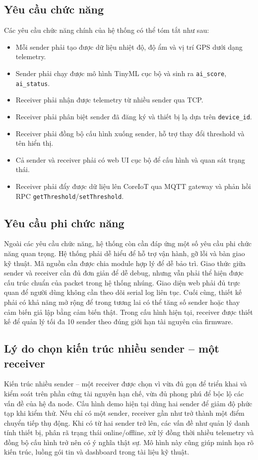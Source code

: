 \documentclass[12pt,a4paper]{report}
\begin{document}
\subsection{Yêu cầu chức năng}
Các yêu cầu chức năng chính của hệ thống có thể tóm tắt như sau:
\begin{itemize}[leftmargin=1.5em]
    \item Mỗi sender phải tạo được dữ liệu nhiệt độ, độ ẩm và vị trí GPS dưới dạng telemetry.
    \item Sender phải chạy được mô hình TinyML cục bộ và sinh ra \texttt{ai\_score}, \texttt{ai\_status}.
    \item Receiver phải nhận được telemetry từ nhiều sender qua TCP.
    \item Receiver phải phân biệt sender đã đăng ký và thiết bị lạ dựa trên \texttt{device\_id}.
    \item Receiver phải đồng bộ cấu hình xuống sender, hỗ trợ thay đổi threshold và tên hiển thị.
    \item Cả sender và receiver phải có web UI cục bộ để cấu hình và quan sát trạng thái.
    \item Receiver phải đẩy được dữ liệu lên CoreIoT qua MQTT gateway và phản hồi RPC \texttt{getThreshold}/\texttt{setThreshold}.
\end{itemize}

\subsection{Yêu cầu phi chức năng}
Ngoài các yêu cầu chức năng, hệ thống còn cần đáp ứng một số yêu cầu phi chức năng quan trọng. Hệ thống phải dễ hiểu để hỗ trợ vận hành, gỡ lỗi và bàn giao kỹ thuật. Mã nguồn cần được chia module hợp lý để dễ bảo trì. Giao thức giữa sender và receiver cần đủ đơn giản để dễ debug, nhưng vẫn phải thể hiện được cấu trúc chuẩn của packet trong hệ thống nhúng. Giao diện web phải đủ trực quan để người dùng không cần theo dõi serial log liên tục. Cuối cùng, thiết kế phải có khả năng mở rộng để trong tương lai có thể tăng số sender hoặc thay cảm biến giả lập bằng cảm biến thật. Trong cấu hình hiện tại, receiver được thiết kế để quản lý tối đa 10 sender theo đúng giới hạn tài nguyên của firmware.

\subsection{Lý do chọn kiến trúc nhiều sender -- một receiver}
Kiến trúc nhiều sender -- một receiver được chọn vì vừa đủ gọn để triển khai và kiểm soát trên phần cứng tài nguyên hạn chế, vừa đủ phong phú để bộc lộ các vấn đề của hệ đa node. Cấu hình demo hiện tại dùng hai sender để giảm độ phức tạp khi kiểm thử. Nếu chỉ có một sender, receiver gần như trở thành một điểm chuyển tiếp thụ động. Khi có từ hai sender trở lên, các vấn đề như quản lý danh tính thiết bị, phân rã trạng thái online/offline, xử lý đồng thời nhiều telemetry và đồng bộ cấu hình trở nên có ý nghĩa thật sự. Mô hình này cũng giúp minh họa rõ kiến trúc, luồng gói tin và dashboard trong tài liệu kỹ thuật.
\end{document}
